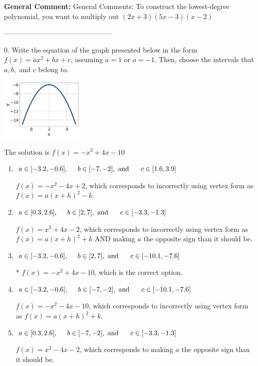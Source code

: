 \documentclass{extbook}[14pt]
\begin{document}
\textbf{General Comment:} General Comments: To construct the lowest-degree polynomial, you want to multiply out $(2x + 3)(5x -3)(x -2)$ 

-----------------------------------------------

0. Write the equation of the graph presented below in the form $f(x)=ax^2+bx+c$, assuming  $a=1$ or $a=-1$. Then, choose the intervals that $a, b,$ and $c$ belong to.
\begin{center} \includegraphics[width=0.3\textwidth]{../Figures/quadraticGraphToEquationA.png} \end{center} 

The solution is $ f(x) = -x^{2} +4 x -10 $ 

\begin{enumerate}[label=\Alph*.] 
\item $ a \in [-3.2, -0.6], \hspace*{5mm} b \in [-7, -2], \text{ and } \hspace*{5mm} c \in [1.6, 3.9] $ 

 $f(x)=-x^{2} -4 x + 2$, which corresponds to incorrectly using vertex form as $f(x) = a(x+h)^2 - k$. 
\item $ a \in [0.3, 2.6], \hspace*{5mm} b \in [2, 7], \text{ and } \hspace*{5mm} c \in [-3.3, -1.3] $ 

 $f(x)=x^{2} +4 x -2$, which corresponds to incorrectly using vertex form as $f(x) = a(x+h)^2+k$ AND making $a$ the opposite sign than it should be. 
\item $ a \in [-3.2, -0.6], \hspace*{5mm} b \in [2, 7], \text{ and } \hspace*{5mm} c \in [-10.1, -7.6] $ 

 * $f(x)=-x^{2} +4 x -10$, which is the correct option. 
\item $ a \in [-3.2, -0.6], \hspace*{5mm} b \in [-7, -2], \text{ and } \hspace*{5mm} c \in [-10.1, -7.6] $ 

 $f(x)=-x^{2} -4 x -10$, which corresponds to incorrectly using vertex form as $f(x) = a(x+h)^2+k$. 
\item $ a \in [0.3, 2.6], \hspace*{5mm} b \in [-7, -2], \text{ and } \hspace*{5mm} c \in [-3.3, -1.3] $ 

 $f(x)=x^{2} -4 x -2$, which corresponds to making $a$ the opposite sign than it should be. 
\end{enumerate} 
 
\end{document}
